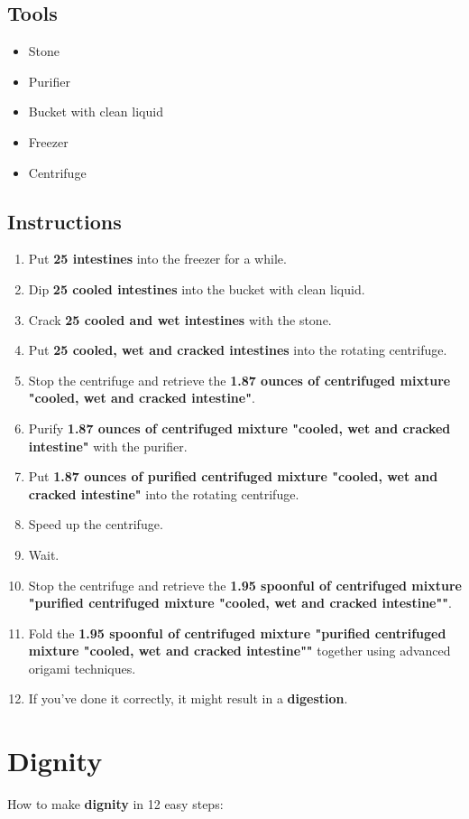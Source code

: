 \documentclass{article}
\begin{document}
\subsection{Tools}\begin{itemize}
\item 
Stone
\item 
Purifier
\item 
Bucket with clean liquid
\item 
Freezer
\item 
Centrifuge
\end{itemize}
\subsection{Instructions}\begin{enumerate}
\item 
Put \textbf{25 intestines} into the freezer for a while.
\item 
Dip \textbf{25 cooled intestines} into the bucket with clean liquid.
\item 
Crack \textbf{25 cooled and wet intestines} with the stone.
\item 
Put \textbf{25 cooled, wet and cracked intestines} into the rotating centrifuge.
\item 
Stop the centrifuge and retrieve the \textbf{1.87 ounces of centrifuged mixture "cooled, wet and cracked intestine"}.
\item 
Purify \textbf{1.87 ounces of centrifuged mixture "cooled, wet and cracked intestine"} with the purifier.
\item 
Put \textbf{1.87 ounces of purified centrifuged mixture "cooled, wet and cracked intestine"} into the rotating centrifuge.
\item 
Speed up the centrifuge.
\item 
Wait.
\item 
Stop the centrifuge and retrieve the \textbf{1.95 spoonful of centrifuged mixture "purified centrifuged mixture "cooled, wet and cracked intestine""}.
\item 
Fold the \textbf{1.95 spoonful of centrifuged mixture "purified centrifuged mixture "cooled, wet and cracked intestine""} together using advanced origami techniques.
\item 
If you've done it correctly, it might result in a \textbf{digestion}.
\end{enumerate}
\newpage
\section{Dignity}How to make \textbf{dignity} in 12 easy steps:
\end{document}
